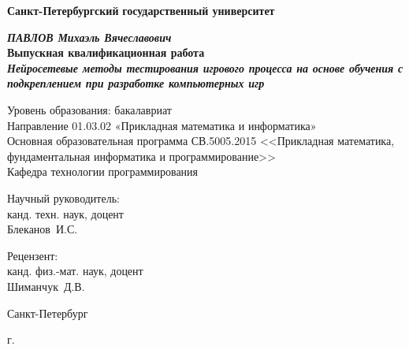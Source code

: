 
\begin{titlepage}
\begin{center}

\textbf{Санкт-Петербургский}
\textbf{государственный университет}

\vspace{35mm}

\textbf{\textit{\large ПАВЛОВ Михаэль Вячеславович}} \\[8mm]
\textbf{\large Выпускная квалификационная работа}\\[3mm]
\textbf{\textit{\large Нейросетевые методы тестирования игрового процесса на основе обучения с подкреплением при разработке компьютерных игр}}

\vspace{20mm}
Уровень образования: бакалавриат\\
Направление 01.03.02 «Прикладная математика и информатика»\\
Основная образовательная программа СВ.5005.2015
<<Прикладная математика, фундаментальная информатика и программирование>>\\
Кафедра технологии программирования\\[25mm]


\begin{flushright}
\begin{minipage}[t]{0.375\textwidth}
{Научный руководитель:} \\
канд. техн. наук, доцент\\Блеканов~И.С.

\vspace{10mm}

{Рецензент:} \\
канд. физ.-мат. наук, доцент\\Шиманчук~Д.В.
\end{minipage}
\end{flushright}

\vfill 

{Санкт-Петербург}
\par{\the\year{} г.}
\end{center}
\end{titlepage}
\restoregeometry
\addtocounter{page}{1}
